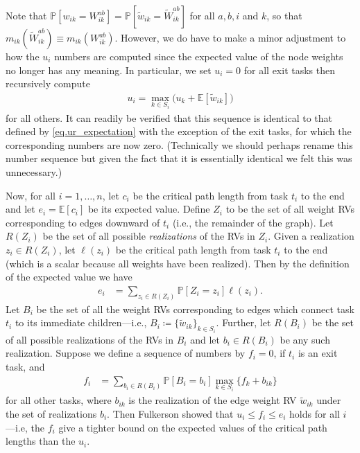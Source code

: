 \documentclass[12pt]{article}
\def\P{\mathbb{P}}
\def\E{\mathbb{E}}
\begin{document}
Note that $\P[w_{ik} = W_{ik}^{ab}] = \P[\tilde{w}_{ik} = \tilde{W}_{ik}^{ab}]$ for all $a, b, i$ and $k$, so that $m_{ik}(\tilde{W}_{ik}^{ab}) \equiv m_{ik}(W_{ik}^{ab})$. However, we do have to make a minor adjustment to how the $u_i$ numbers are computed since the expected value of the node weights no longer has any meaning. In particular, we set $u_i = 0$ for all exit tasks then recursively compute       
\begin{align}
u_i = \max_{k \in S_i} \big( u_k + \E[\tilde{w}_{ik}] \big) \label{eq.ur_edge_only}
\end{align}
for all others. It can readily be verified that this sequence is identical to that defined by \eqref{eq.ur_expectation} with the exception of the exit tasks, for which the corresponding numbers are now zero. (Technically we should perhaps rename this number sequence but given the fact that it is essentially identical we felt this was unnecessary.) 

Now, for all $i = 1, \dots, n$, let $c_i$ be the critical path length from task $t_i$ to the end and let $e_i = \E[c_i]$ be its expected value. Define $Z_i$ to be the set of all weight RVs corresponding to edges downward of $t_i$ (i.e., the remainder of the graph). Let $R(Z_i)$ be the set of all possible {\em realizations} of the RVs in $Z_i$. Given a realization $z_i \in R(Z_i)$, let $\ell(z_i)$ be the critical path length from task $t_i$ to the end (which is a scalar because all weights have been realized). Then by the definition of the expected value we have
\begin{align}
e_i &= \sum_{z_i \in R(Z_i)} \P[Z_i = z_i] \ell(z_i). \label{eq.ei}
\end{align}
Let $B_i$ be the set of all the weight RVs corresponding to edges which connect task $t_i$ to its immediate children---i.e., $B_i \coloneqq \{ \tilde{w}_{ik} \}_{k \in S_i}$. Further, let $R(B_i)$ be the set of all possible realizations of the RVs in $B_i$ and let $b_i \in R(B_i)$ be any such realization. Suppose we define a sequence of numbers by $f_i = 0$, if $t_i$ is an exit task, and
\begin{align}
f_i &= \sum_{b_i \in R(B_i)} \P[B_i = b_i] \max_{k \in S_i} \{ f_k + b_{ik} \} \label{eq.f_fulkerson}
\end{align}
for all other tasks, where $b_{ik}$ is the realization of the edge weight RV $\tilde{w}_{ik}$ under the set of realizations $b_i$. Then Fulkerson showed that $u_i \leq f_i \leq e_i$ holds for all $i$---i.e, the $f_i$ give a tighter bound on the expected values of the critical path lengths than the $u_i$.
\end{document}
